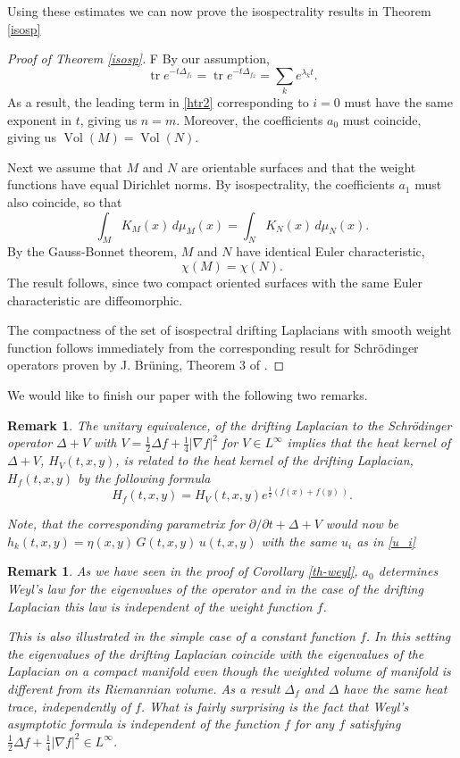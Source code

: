 \documentclass[letterpaper,12pt]{amsart}
\newtheorem{remark}[thm]{Remark}
\def \p{\partial}
\def \eref{\eqref}
\newcommand{\tr}{\mathop{\mathrm{tr}}}
\newcommand{\Vol}{\operatorname{Vol}}
\begin{document}
Using these estimates we can now prove the isospectrality results in Theorem \ref{isosp}
\begin{proof}[Proof of Theorem \ref{isosp}]F
By our assumption,
\[
\tr e^{-t\Delta_{f_1}}=\tr e^{-t\Delta_{f_2}} = \sum_k e^{\lambda_k t}.
\]
As a result, the leading term in \eref{htr2} corresponding to $i=0$ must have the same exponent in $t$, giving us $n=m$.  Moreover, the coefficients $a_0$ must coincide, giving us $\Vol(M)= \Vol(N)$.

Next we assume that $M$ and $N$ are orientable surfaces and that the weight functions have equal Dirichlet norms.  By isospectrality, the coefficients $a_1$ must also coincide, so that
\[
\int_M    K_M(x)   \, d\mu_M(x)   = \int_N  K_N (x) \, d\mu_N(x).
\]
By the Gauss-Bonnet theorem, $M$ and $N$ have identical Euler characteristic,
\[
\chi(M)=\chi(N).
\]
The result follows, since two compact oriented surfaces with the same Euler characteristic are diffeomorphic.

The compactness of the set of isospectral drifting Laplacians with smooth weight function follows immediately from the corresponding result for Schr\"odinger operators proven by J. Br\"uning, Theorem 3 of  \cite{bruning}.
\end{proof}

We would like to finish our paper with the following two remarks.

\begin{remark}
The unitary equivalence, of the drifting Laplacian to the Schr\"odinger operator $\Delta + V$ with $V = \frac{1}{2} \Delta f + \frac{1}{4} | \nabla f|^2$ for $V\in L^\infty$ implies that  the heat kernel of $\Delta + V$, $H_V(t,x,y)$,  is related to the heat kernel of the drifting Laplacian, $H_f(t,x,y)$ by the following formula
\[
H_f(t,x,y)=H_V(t,x,y) e^{\frac 12 (f(x)+f(y)\,)}.
\]

Note, that the corresponding parametrix for $\p/\p t + \Delta +V $ would now be $h_k(t,x,y)= \eta(x,y) \, G(t,x,y) \, u(t,x,y)$ with the same $u_i$ as in \eref{u_i}
\end{remark}

\begin{remark}
As we have seen in the proof of Corollary \ref{th-weyl}, $a_0$ determines Weyl's law for the eigenvalues of the operator and in the case of the drifting Laplacian this law is independent of the weight function $f$.

This is also illustrated in the simple case of a constant function $f$. In this setting the eigenvalues of the drifting Laplacian coincide with the eigenvalues of the Laplacian on a compact manifold even though the weighted volume of manifold is different from its Riemannian volume. As a result $\Delta_f$ and $\Delta$ have the same heat trace, independently of $f$. What is fairly surprising is the fact that Weyl's asymptotic formula is independent of the function $f$ for any $f$ satisfying $\frac{1}{2} \Delta f + \frac{1}{4} | \nabla f|^2 \in L^\infty$.
\end{remark}
\end{document}

